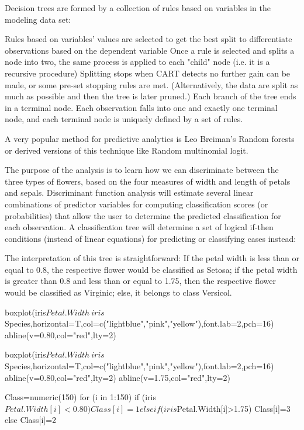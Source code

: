 Decision trees are formed by a collection of rules based on variables in the modeling data set:

Rules based on variables' values are selected to get the best split to differentiate observations based on the dependent variable
Once a rule is selected and splits a node into two, the same process is applied to each "child" node (i.e. it is a recursive procedure)
Splitting stops when CART detects no further gain can be made, or some pre-set stopping rules are met. (Alternatively, the data are split as much as possible and then the tree is later pruned.)
Each branch of the tree ends in a terminal node. Each observation falls into one and exactly one terminal node, and each terminal node is uniquely defined by a set of rules.

A very popular method for predictive analytics is Leo Breiman's Random forests or derived versions of this technique like Random multinomial logit.


The purpose of the analysis is to learn how we can discriminate between the three types of flowers, based on the four measures of width and length of petals and sepals. Discriminant function analysis will estimate several linear combinations of predictor variables for computing classification scores (or probabilities) that allow the user to determine the predicted classification for each observation. A classification tree will determine a set of logical if-then conditions (instead of linear equations) for predicting or classifying cases instead:



The interpretation of this tree is straightforward: If the petal width is less than or equal to 0.8, the respective flower would be classified as Setosa; if the petal width is greater than 0.8 and less than or equal to 1.75, then the respective flower would be classified as Virginic; else, it belongs to class Versicol.



boxplot(iris$Petal.Width~iris$Species,horizontal=T,col=c("lightblue","pink","yellow"),font.lab=2,pch=16)
abline(v=0.80,col="red",lty=2)

boxplot(iris$Petal.Width~iris$Species,horizontal=T,col=c("lightblue","pink","yellow"),font.lab=2,pch=16)
abline(v=0.80,col="red",lty=2)
abline(v=1.75,col="red",lty=2)

Class=numeric(150)
for (i in 1:150)
  { 
  if (iris$Petal.Width[i]<0.80) { 
     Class[i]=1
   } else if (iris$Petal.Width[i]>1.75) { 
     Class[i]=3
   }else Class[i]=2
  }



